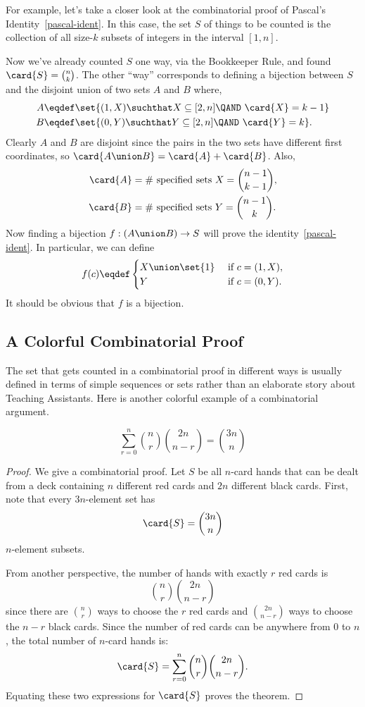 For example, let's take a closer look at the combinatorial proof of
Pascal's Identity~\eqref{pascal-ident}.  In this case, the set $S$ of
things to be counted is the collection of all size-$k$ subsets of
integers in the interval $[1,n]$.

Now we've already counted $S$ one way, via the Bookkeeper Rule, and
found $\card{S} = \binom{n}{k}$.  The other ``way'' corresponds to
defining a bijection between $S$ and the disjoint union of two sets
$A$ and $B$ where,
\begin{align*}
A & \eqdef \set{(1,X) \suchthat X \subseteq [2,n] \QAND\ \card{X}=k-1}\\
B & \eqdef \set{(0,Y) \suchthat Y \subseteq [2,n] \QAND\ \card{Y}=k}.
\end{align*}
Clearly $A$ and $B$ are disjoint since the pairs in the two sets have
different first coordinates, so $\card{A \union B} = \card{A} +
\card{B}$.  Also,
\begin{align*}
\card{A} & = \text{\# specified sets $X$} =  \binom{n-1}{k-1},\\
\card{B} & = \text{\# specified sets $Y$} = \binom{n-1}{k}.
\end{align*}
Now finding a bijection $f:(A \union B) \to S$ will prove the
identity~\eqref{pascal-ident}.  In particular, we can define
\[
f(c) \eqdef \begin{cases} X \union \set{1} &\text{ if } c = (1,X),\\
                          Y  &\text{ if } c = (0,Y).
\end{cases}
\]
It should be obvious that $f$ is a bijection.

\subsection{A Colorful Combinatorial Proof} 

The set that gets counted in a combinatorial proof in different ways
is usually defined in terms of simple sequences or sets rather than an
elaborate story about Teaching Assistants.  Here is another colorful
example of a combinatorial argument.

\begin{theorem}
\label{th:comb-ex}
\[
\sum_{r=0}^n \binom{n}{r} \binom{2n}{n-r} = \binom{3n}{n}
\]
\end{theorem}

\begin{proof}
We give a combinatorial proof.  Let $S$ be all $n$-card hands that can
be dealt from a deck containing $n$ different red cards and $2n$
different black cards.  First, note that every $3n$-element set has
%
\[
\card{S} = \binom{3n}{n}
\]
%
$n$-element subsets.

From another perspective, the number of hands with exactly $r$ red
cards is
%
\[
\binom{n}{r} \binom{2n}{n - r}
\]
%
since there are $\binom{n}{r}$ ways to choose the $r$ red cards and
$\binom{2n}{n - r}$ ways to choose the $n - r$ black cards.  Since the
number of red cards can be anywhere from 0 to $n$, the total number of
$n$-card hands is:
%
\[
    \card{S} = \sum_{r=0}^n \binom{n}{r} \binom{2n}{n-r}.
\]
%
Equating these two expressions for $\card{S}$ proves the theorem.
\end{proof}

